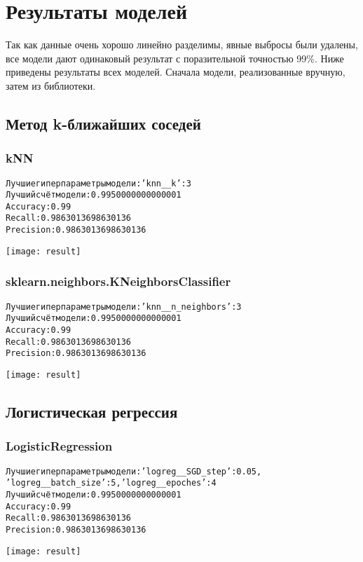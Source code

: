 \graphicspath{{images/}}
\section{Результаты моделей}
Так как данные очень хорошо линейно разделимы, явные выбросы были удалены, все модели дают одинаковый результат с поразительной точностью 99\%. Ниже приведены результаты всех моделей. Сначала модели, реализованные вручную, затем из библиотеки.

\subsection{Метод k-ближайших соседей}
\subsubsection{kNN}
\begin{alltt}
Лучшие гиперпараметры модели: {'knn__k': 3}
Лучший счёт модели: 0.9950000000000001
Accuracy: 0.99
Recall: 0.9863013698630136
Precision: 0.9863013698630136
\end{alltt}
\begin{center}
\texttt{[image: result]}
\end{center}
\pagebreak

\subsubsection{sklearn.neighbors.KNeighborsClassifier}
\begin{alltt}
Лучшие гиперпараметры модели: {'knn__n_neighbors': 3}
Лучший счёт модели: 0.9950000000000001
Accuracy: 0.99
Recall: 0.9863013698630136
Precision: 0.9863013698630136
\end{alltt}
\begin{center}
\texttt{[image: result]}
\end{center}
\pagebreak

\subsection{Логистическая регрессия}
\subsubsection{LogisticRegression}
\begin{alltt}
Лучшие гиперпараметры модели: {'logreg__SGD_step': 0.05,
'logreg__batch_size': 5, 'logreg__epoches': 4}
Лучший счёт модели: 0.9950000000000001
Accuracy: 0.99
Recall: 0.9863013698630136
Precision: 0.9863013698630136
\end{alltt}
\begin{center}
\texttt{[image: result]}
\end{center}

